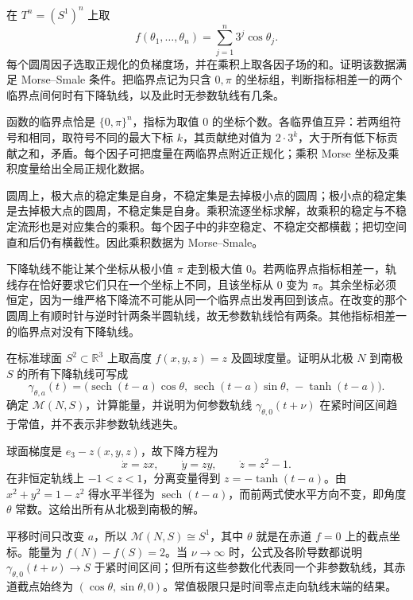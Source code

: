 \begin{exercise}\label{g2:ex:product-circle-morse-smale}
	在 \(T^n=(S^1)^n\) 上取
	\[
		f(\theta_1,\ldots,\theta_n)=\sum_{j=1}^n3^j\cos\theta_j.
	\]
	每个圆周因子选取正规化的负梯度场，并在乘积上取各因子场的和。证明该数据满足 Morse--Smale 条件。把临界点记为只含 \(0,\pi\) 的坐标组，判断指标相差一的两个临界点间何时有下降轨线，以及此时无参数轨线有几条。
\end{exercise}
\begin{solution}
	函数的临界点恰是 \(\{0,\pi\}^n\)，指标为取值 \(0\) 的坐标个数。各临界值互异：若两组符号和相同，取符号不同的最大下标 \(k\)，其贡献绝对值为 \(2\cdot3^k\)，大于所有低下标贡献之和，矛盾。每个因子可把度量在两临界点附近正规化；乘积 Morse 坐标及乘积度量给出全局正规化数据。

	圆周上，极大点的稳定集是自身，不稳定集是去掉极小点的圆周；极小点的稳定集是去掉极大点的圆周，不稳定集是自身。乘积流逐坐标求解，故乘积的稳定与不稳定流形也是对应集合的乘积。每个因子中的非空稳定、不稳定交都横截；把切空间直和后仍有横截性。因此乘积数据为 Morse--Smale。

	下降轨线不能让某个坐标从极小值 \(\pi\) 走到极大值 \(0\)。若两临界点指标相差一，轨线存在恰好要求它们只在一个坐标上不同，且该坐标从 \(0\) 变为 \(\pi\)。其余坐标必须恒定，因为一维严格下降流不可能从同一个临界点出发再回到该点。在改变的那个圆周上有顺时针与逆时针两条半圆轨线，故无参数轨线恰有两条。其他指标相差一的临界点对没有下降轨线。
\end{solution}

\begin{exercise}\label{g2:ex:sphere-gradient-anchors}
	在标准球面 \(S^2\subset\mathbb R^3\) 上取高度 \(f(x,y,z)=z\) 及圆球度量。证明从北极 \(N\) 到南极 \(S\) 的所有下降轨线可写成
	\[
		\gamma_{\theta,a}(t)
		=\bigl(\operatorname{sech}(t-a)\cos\theta,\,
		\operatorname{sech}(t-a)\sin\theta,\,-\tanh(t-a)\bigr).
	\]
	确定 \(\mathcal M(N,S)\)，计算能量，并说明为何参数轨线 \(\gamma_{\theta,0}(t+\nu)\) 在紧时间区间趋于常值，并不表示非参数轨线逃失。
\end{exercise}
\begin{solution}
	球面梯度是 \(e_3-z(x,y,z)\)，故下降方程为
	\[
		\dot x=zx,\qquad \dot y=zy,\qquad \dot z=z^2-1.
	\]
	在非恒定轨线上 \(-1<z<1\)，分离变量得到 \(z=-\tanh(t-a)\)。由 \(x^2+y^2=1-z^2\) 得水平半径为 \(\operatorname{sech}(t-a)\)，而前两式使水平方向不变，即角度 \(\theta\) 常数。这给出所有从北极到南极的解。

	平移时间只改变 \(a\)，所以 \(\mathcal M(N,S)\cong S^1\)，其中 \(\theta\) 就是在赤道 \(f=0\) 上的截点坐标。能量为 \(f(N)-f(S)=2\)。当 \(\nu\to\infty\) 时，公式及各阶导数都说明 \(\gamma_{\theta,0}(t+\nu)\to S\) 于紧时间区间；但所有这些参数化代表同一个非参数轨线，其赤道截点始终为 \((\cos\theta,\sin\theta,0)\)。常值极限只是时间零点走向轨线末端的结果。
\end{solution}

